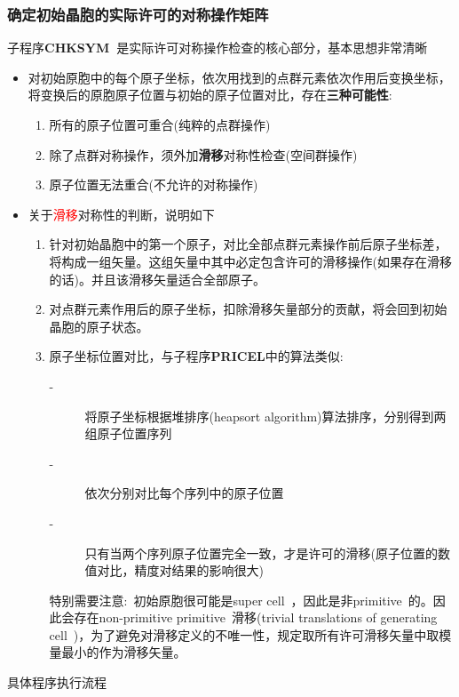 \documentclass{article}      %
\begin{document}
\subsubsection{确定初始晶胞的实际许可的对称操作矩阵}
子程序\textbf{CHKSYM~}是实际许可对称操作检查的核心部分，基本思想非常清晰
\begin{itemize}
	\item 对初始原胞中的每个原子坐标，依次用找到的点群元素依次作用后变换坐标，将变换后的原胞原子位置与初始的原子位置对比，存在\textbf{三种可能性}:
\begin{enumerate}
	\item 所有的原子位置可重合(纯粹的点群操作)
	\item 除了点群对称操作，须外加\textbf{滑移}对称性检查(空间群操作)
	\item 原子位置无法重合(不允许的对称操作)
\end{enumerate}
	\item 关于\textcolor{red}{滑移}对称性的判断，说明如下
		\begin{enumerate}
			\item 针对初始晶胞中的第一个原子，对比全部点群元素操作前后原子坐标差，将构成一组矢量。这组矢量中其中必定包含许可的滑移操作(如果存在滑移的话)。并且该滑移矢量适合全部原子。
			\item 对点群元素作用后的原子坐标，扣除滑移矢量部分的贡献，将会回到初始晶胞的原子状态。
			\item 原子坐标位置对比，与子程序\textbf{PRICEL}中的算法类似:~
				\begin{description}
					\item[-] 将原子坐标根据堆排序\textrm{(heapsort algorithm)}算法排序，分别得到两组原子位置序列
					\item[-] 依次分别对比每个序列中的原子位置
					\item[-] 只有当两个序列原子位置完全一致，才是许可的滑移(原子位置的数值对比，精度对结果的影响很大)
				\end{description}
特别需要注意:~初始原胞很可能是\textrm{super cell~}，因此是非\textrm{primitive~}的。因此会存在\textrm{non-primitive primitive~}滑移(\textrm{trivial translations of generating cell~})，为了避免对滑移定义的不唯一性，规定取所有许可滑移矢量中取模量最小的作为滑移矢量。
		\end{enumerate}
\end{itemize}
具体程序执行流程
\end{document}
